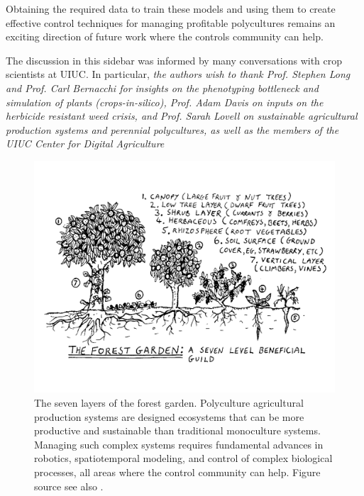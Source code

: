  Obtaining the required data to train these models and using them to create effective control techniques for managing profitable polycultures remains an exciting direction of future work where the controls community can help.
 
 The discussion in this sidebar was informed by many conversations with  crop scientists at UIUC. In particular, 
\textit{the authors wish to thank Prof. Stephen Long and Prof. Carl Bernacchi for insights on the phenotyping bottleneck and simulation of plants (\textit{crops-in-silico}), Prof. Adam Davis on inputs on the herbicide resistant weed crisis, and Prof. Sarah Lovell on sustainable agricultural production systems and perennial polycultures, as well as the members of the UIUC Center for Digital Agriculture} 

\begin{figure}[tbh]
\includegraphics[width=\textwidth]{./figures/polyculture}
\caption{The seven layers of the forest garden. Polyculture agricultural production systems are designed ecosystems that can be more productive and sustainable than traditional monoculture systems. Managing such complex systems requires fundamental advances in robotics, spatiotemporal modeling, and control of complex biological processes, all areas where the control community can help. Figure source \cite{polyculture_fig}  see also \cite{rhodes2012feeding}.}
\label{fig:polycultures}
\end{figure}



